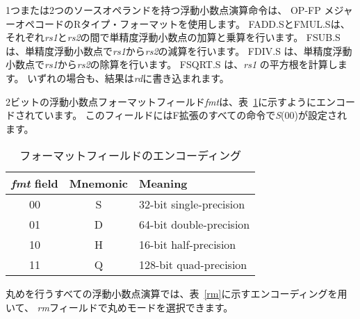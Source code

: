{1つまたは2つのソースオペランドを持つ浮動小数点演算命令は、
OP-FP メジャーオペコードのRタイプ・フォーマットを使用します。
FADD.SとFMUL.Sは、それぞれ{\em rs1}と{\em rs2}の間で単精度浮動小数点の加算と乗算を行います。
FSUB.S は、単精度浮動小数点で{\em rs1}から{\em rs2}の減算を行います。 
FDIV.S は、単精度浮動小数点で{\em rs1}から{\em rs2}の除算を行います。
FSQRT.S は、{\em rs1} の平方根を計算します。
いずれの場合も、結果は{\em rd}に書き込まれます。

\begin{comment}
The 2-bit floating-point format field {\em fmt} is encoded as shown in
Table~\ref{tab:fmt}.  It is set to {\em S} (00) for all instructions in
the F extension.
\end{comment}

2ビットの浮動小数点フォーマットフィールド{\em fmt}は、表~\ref{tab:fmt}に示すようにエンコードされています。
このフィールドにはF拡張のすべての命令で{\em S}(00)が設定されます。

\begin{table}[htp]
\begin{small}
\begin{center}
\begin{tabular}{|c|c|l|}
\hline
{\em fmt} field &
Mnemonic &
Meaning \\
\hline
00 & S & 32-bit single-precision \\
01 & D & 64-bit double-precision \\
10 & H & 16-bit half-precision \\
11 & Q & 128-bit quad-precision \\
\hline
\end{tabular}
\end{center}
\end{small}
\begin{comment}
\caption{Format field encoding.}
\end{comment}
\caption{フォーマットフィールドのエンコーディング}
\label{tab:fmt}
\end{table}

\begin{comment}
All floating-point operations that perform rounding can select the
rounding mode using the {\em rm} field with the encoding shown in
Table~\ref{rm}.
\end{comment}

丸めを行うすべての浮動小数点演算では、表~\ref{rm}に示すエンコーディングを用いて、
{\em rm}フィールドで丸めモードを選択できます。

\begin{comment}
Floating-point minimum-number and maximum-number instructions FMIN.S and
FMAX.S write, respectively, the smaller or larger of {\em rs1} and {\em rs2}
to {\em rd}.  For the purposes of these instructions only, the value $-0.0$ is
considered to be less than the value $+0.0$.  If both inputs are NaNs, the
result is the canonical NaN.  If only one operand is a NaN, the result is the
non-NaN operand.  Signaling NaN inputs set the invalid operation exception flag,
even when the result is not NaN.
\end{comment}

}
